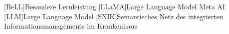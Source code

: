 \begin{acronym}[SPARQL]
[BeLL]{Besondere Lernleistung}
[LLaMA]{Large Language Model Meta AI}
[LLM]{Large Language Model}
[SNIK]{Semantisches Netz des integrierten Informationsmanagements im Krankenhaus}
\end{acronym}
